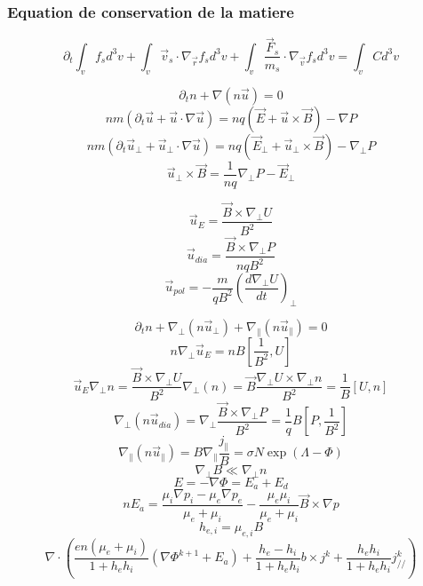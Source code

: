 \documentclass[12pt]{article}
\begin{document}
\subsubsection{Equation de conservation de la matiere}
$$\partial_t\int_v f_s d^3v
+\int_v\vec{v}_s\cdot\nabla_{\vec{r}}f_sd^3v+\int_v\frac{\vec{F}_s}{m_s}\cdot\nabla_{\vec{v}}f_sd^3v=\int_vCd^3v$$

$$\partial_tn+\nabla\left(n\vec{u}\right)=0$$
$$nm\left(\partial_t\vec{u}+\vec{u}\cdot\nabla\vec{u}\right)=nq\left(\vec{E}+\vec{u}\times\vec{B}\right)-\nabla
P$$
$$nm\left(\partial_t\vec{u}_\perp+\vec{u}_\perp\cdot\nabla\vec{u}\right)=nq\left(\vec{E}_\perp+\vec{u}_\perp\times\vec{B}\right)-\nabla_\perp
P$$
$$\vec{u}_\perp\times\vec{B}=\frac{1}{nq}\nabla_\perp P-\vec{E}_\perp$$

$$\vec{u}_E=\frac{\vec{B}\times\nabla_\perp U}{B^2}$$
$$\vec{u}_{dia}=\frac{\vec{B}\times\nabla_\perp P}{nqB^2}$$
$$\vec{u}_{pol}=-\frac{m}{qB^2}\left(\frac{d\nabla_\perp U}{dt}\right)_\perp$$

$$\partial_tn+\nabla_\perp\left(n\vec{u}_\perp\right)+\nabla_\parallel\left(n\vec{u}_\parallel\right)=0$$
$$n\nabla_\perp\vec{u}_E=nB\left[\frac{1}{B^2},U\right]$$
$$\vec{u}_E\nabla_\perp n=\frac{\vec{B}\times\nabla_\perp
U}{B^2}\nabla_\perp\left(n\right)=\vec{B}\frac{\nabla_\perp
U\times\nabla_\perp n}{B^2}=\frac{1}{B}\left[U,n\right]$$
$$\nabla_\perp\left(n\vec{u}_{dia}\right)=\nabla_\perp\frac{\vec{B}\times\nabla_\perp
P}{B^2}=\frac{1}{q}B\left[P,\frac{1}{B^2}\right]$$
$$\nabla_\parallel\left(n\vec{u}_\parallel\right)=B\nabla_\parallel\frac{j_\parallel}{B}=\sigma
N \exp\left(\Lambda-\Phi\right)$$
$$\nabla_\perp B \ll \nabla_\perp n $$
$$E=-\nabla\Phi=E_a+E_d$$
$$nE_a=\frac{\mu_i\nabla p_i-\mu_e\nabla p_e}{\mu_e+\mu_i}-\frac{\mu_e\mu_i}{\mu_e+\mu_i}\vec{B}\times\nabla p$$
$$h_{e,i}=\mu_{e,i}B$$
$$\nabla\cdot\left(\frac{en(\mu_e+\mu_i)}{1+h_eh_i}(\nabla\Phi^{k+1}+E_a)+\frac{h_e-h_i}{1+h_eh_i}b\times j^k+\frac{h_eh_i}{1+h_eh_i}j^k_{//}\right)$$
\end{document}
